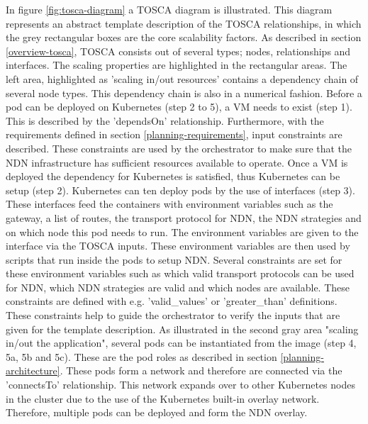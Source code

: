 In figure \ref{fig:tosca-diagram} a TOSCA diagram is illustrated. This diagram represents an abstract template description of the TOSCA relationships, in which the grey rectangular boxes are the core scalability factors. As described in section \ref{overview-tosca}, TOSCA consists out of several types; nodes, relationships and interfaces. The scaling properties are highlighted in the rectangular areas. The left area, highlighted as 'scaling in/out resources' contains a dependency chain of several node types. This dependency chain is also in a numerical fashion. Before a pod can be deployed on Kubernetes (step 2 to 5), a VM needs to exist (step 1). This is described by the 'dependsOn' relationship. Furthermore, with the requirements defined in section \ref{planning-requirements}, input constraints are described. These constraints are used by the orchestrator to make sure that the NDN infrastructure has sufficient resources available to operate. Once a VM is deployed the dependency for Kubernetes is satisfied, thus Kubernetes can be setup (step 2). Kubernetes can ten deploy pods by the use of interfaces (step 3). These interfaces feed the containers with environment variables such as the gateway, a list of routes, the transport protocol for NDN, the NDN strategies and on which node this pod needs to run. The environment variables are given to the interface via the TOSCA inputs. These environment variables are then used by scripts that run inside the pods to setup NDN. Several constraints are set for these environment variables such as which valid transport protocols can be used for NDN, which NDN strategies are valid and which nodes are available. These constraints are defined with e.g. 'valid\_values' or 'greater\_than' definitions. These constraints help to guide the orchestrator to verify the inputs that are given for the template description. As illustrated in the second gray area "scaling in/out the application", several pods can be instantiated from the image (step 4, 5a, 5b and 5c). These are the pod roles as described in section \ref{planning-architecture}. These pods form a network and therefore are connected via the 'connectsTo' relationship. This network expands over to other Kubernetes nodes in the cluster due to the use of the Kubernetes built-in overlay network. Therefore, multiple pods can be deployed and form the NDN overlay. 

